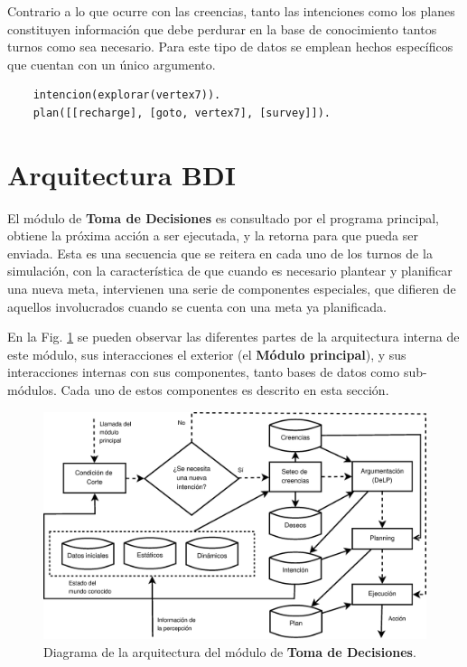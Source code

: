 \documentclass[oneside]{book}
\theoremstyle{definition}
\theoremstyle{example}
\begin{document}
Contrario a lo que ocurre con las creencias, tanto las intenciones como los planes 
constituyen información que debe perdurar en la base de conocimiento tantos turnos 
como sea necesario. Para este tipo de datos se emplean hechos específicos que cuentan 
con un único argumento.

\begin{verbatim}
    intencion(explorar(vertex7)).
    plan([[recharge], [goto, vertex7], [survey]]).
\end{verbatim}

\section{Arquitectura BDI} %

\label{sec:arquitecturaBDI}

El módulo de \textbf{Toma de Decisiones} es consultado por el programa 
principal, obtiene la próxima acción a ser ejecutada, y la retorna para que 
pueda ser enviada. Esta es una secuencia que se reitera en cada uno de los 
turnos de la simulación, con la característica de que cuando es necesario 
plantear y planificar una nueva meta, intervienen una serie de componentes 
especiales, que difieren de aquellos involucrados cuando se cuenta con una 
meta ya planificada. 

En la Fig. \ref{fig:agentProlog} se pueden observar las diferentes partes de la
arquitectura interna de este módulo, sus interacciones el exterior (el 
\textbf{Módulo principal}), y sus interacciones internas con sus componentes,
tanto bases de datos como sub-módulos. Cada uno de estos componentes es 
descrito en esta sección.

\begin{figure}
 \includegraphics[width=\textwidth]{agent_prolog.eps}
 \caption{Diagrama de la arquitectura del módulo de \textbf{Toma de Decisiones}.}
 \label{fig:agentProlog}
\end{figure}
\end{document}
